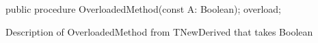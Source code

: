 \documentclass{report}
\begin{document}
\begin{list}{}{
\setlength{\itemindent}{0cm}
\setlength{\listparindent}{0cm}
\setlength{\leftmargin}{\evensidemargin}
\addtolength{\leftmargin}{\tmplength}
\settowidth{\labelsep}{X}
\addtolength{\leftmargin}{\labelsep}
\setlength{\labelwidth}{\tmplength}
}
\begin{flushleft}
\item[\textbf{Declaration}\hfill]
\begin{ttfamily}
public procedure OverloadedMethod(const A: Boolean); overload;\end{ttfamily}


\end{flushleft}
\par
\item[\textbf{Description}]
Description of OverloadedMethod from TNewDerived that takes Boolean

\end{list}
\end{document}
